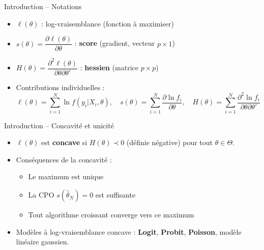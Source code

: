 \documentclass[11pt,aspectratio=169]{beamer}
\begin{document}
\begin{frame}{Introduction -- Notations}

\begin{itemize}

\item $\ell(\theta)$ : log-vraisemblance (fonction à maximiser)\newline

\item $s(\theta) = \dfrac{\partial \ell(\theta)}{\partial \theta}$ : \textbf{score} (gradient, vecteur $p \times 1$)\newline

\item $H(\theta) = \dfrac{\partial^2 \ell(\theta)}{\partial \theta \partial \theta'}$ : \textbf{hessien} (matrice $p \times p$)\newline

\item Contributions individuelles :
  \[
  \ell(\theta) = \sum_{i=1}^{N} \ln f(y_i | X_i, \theta), \quad s(\theta) = \sum_{i=1}^{N} \frac{\partial \ln f_i}{\partial \theta}, \quad H(\theta) = \sum_{i=1}^{N} \frac{\partial^2 \ln f_i}{\partial \theta \partial \theta'}
  \]

\end{itemize}

\end{frame}

\begin{frame}{Introduction -- Concavité et unicité}

\begin{itemize}

\item $\ell(\theta)$ est \textbf{concave} si $H(\theta) \prec 0$ (définie négative) pour tout $\theta \in \Theta$.\newline

\item Conséquences de la concavité :
  \begin{itemize}
    \item Le maximum est unique\newline
    \item La CPO $s(\hat{\theta}_N) = 0$ est suffisante\newline
    \item Tout algorithme croissant converge vers ce maximum\newline
  \end{itemize}

\item Modèles à log-vraisemblance concave : \textbf{Logit}, \textbf{Probit}, \textbf{Poisson}, modèle linéaire gaussien.

\end{itemize}

\end{frame}
\end{document}
